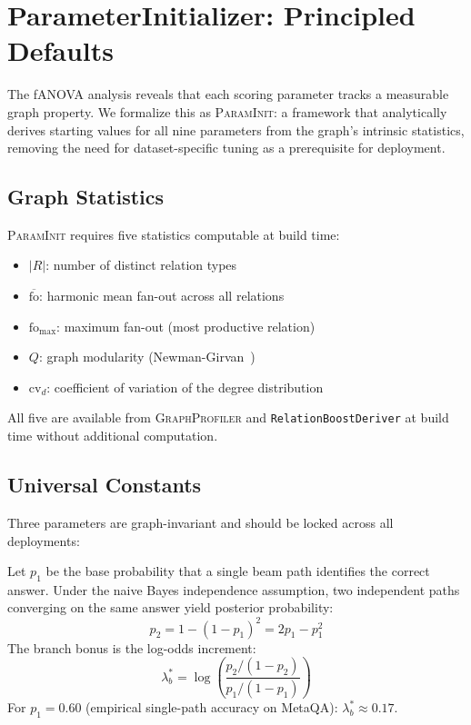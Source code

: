 \documentclass[10pt,twocolumn]{article}
\newcommand{\PI}{\textsc{ParamInit}}
\newcommand{\fanova}{f\textsc{ANOVA}}
\begin{document}
\section{ParameterInitializer: Principled Defaults}
\label{sec:paraminit}

The \fanova{} analysis reveals that each scoring parameter tracks a measurable
graph property. We formalize this as \PI{}: a framework that analytically derives
starting values for all nine parameters from the graph's intrinsic statistics,
removing the need for dataset-specific tuning as a prerequisite for deployment.

\subsection{Graph Statistics}
\PI{} requires five statistics computable at build time:

\begin{itemize}
  \item $|R|$: number of distinct relation types
  \item $\overline{\mathrm{fo}}$: harmonic mean fan-out across all relations
  \item $\mathrm{fo}_{\max}$: maximum fan-out (most productive relation)
  \item $Q$: graph modularity (Newman-Girvan~\cite{newman2004modularity})
  \item $\mathrm{cv}_d$: coefficient of variation of the degree distribution
\end{itemize}

All five are available from \textsc{GraphProfiler} and \texttt{RelationBoostDeriver}
at build time without additional computation.

\subsection{Universal Constants}

Three parameters are graph-invariant and should be locked across all deployments:

\begin{definition}
\label{def:bcc}
Let $p_1$ be the base probability that a single beam path identifies the correct
answer. Under the naive Bayes independence assumption, two independent paths
converging on the same answer yield posterior probability:
\[
  p_2 = 1 - (1-p_1)^2 = 2p_1 - p_1^2
\]
The branch bonus is the log-odds increment:
\[
  \lambda_b^* = \log\!\left(\frac{p_2/(1-p_2)}{p_1/(1-p_1)}\right)
\]
For $p_1 = 0.60$ (empirical single-path accuracy on MetaQA):
$\lambda_b^* \approx \mathbf{0.17}$.
\end{definition}
\end{document}

